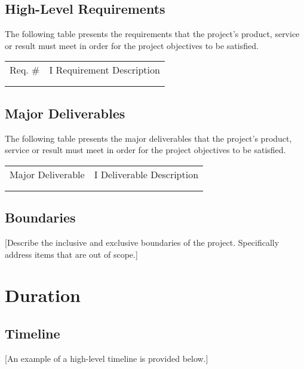 \hypertarget{high-level-requirements}{%
\subsection{High-Level Requirements}\label{high-level-requirements}}

The following table presents the requirements that the project's
product, service or result must meet in order for the project objectives
to be satisfied.

\begin{longtable}[]{@{}ll@{}}
\toprule
\endhead
Req. \# & I Requirement Description\tabularnewline
&\tabularnewline
&\tabularnewline
\bottomrule
\end{longtable}

\hypertarget{major-deliverables}{%
\subsection{Major Deliverables}\label{major-deliverables}}

The following table presents the major deliverables that the project's
product, service or result must meet in order for the project objectives
to be satisfied.

\begin{longtable}[]{@{}ll@{}}
\toprule
\endhead
Major Deliverable & I Deliverable Description\tabularnewline
&\tabularnewline
&\tabularnewline
\bottomrule
\end{longtable}

\hypertarget{boundaries}{%
\subsection{Boundaries}\label{boundaries}}

{[}Describe the inclusive and exclusive boundaries of the project.
Specifically address items that are out of scope.{]}

\hypertarget{duration}{%
\section{Duration}\label{duration}}

\hypertarget{timeline}{%
\subsection{Timeline}\label{timeline}}

{[}An example of a high-level timeline is provided below.{]}

